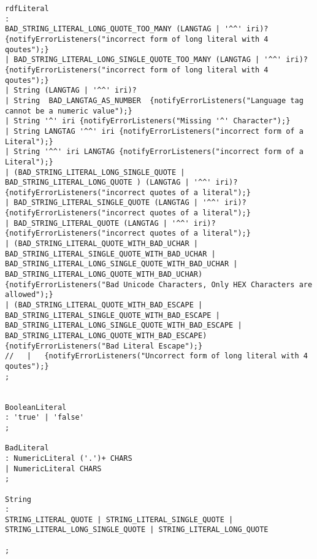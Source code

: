 \begin{lstlisting}[breaklines,basicstyle=\ttfamily]
rdfLiteral
: 
BAD_STRING_LITERAL_LONG_QUOTE_TOO_MANY (LANGTAG | '^^' iri)? {notifyErrorListeners("incorrect form of long literal with 4 qoutes");}
| BAD_STRING_LITERAL_LONG_SINGLE_QUOTE_TOO_MANY (LANGTAG | '^^' iri)? {notifyErrorListeners("incorrect form of long literal with 4 qoutes");}
| String (LANGTAG | '^^' iri)?
| String  BAD_LANGTAG_AS_NUMBER  {notifyErrorListeners("Language tag cannot be a numeric value");}
| String '^' iri {notifyErrorListeners("Missing '^' Character");}
| String LANGTAG '^^' iri {notifyErrorListeners("incorrect form of a Literal");}
| String '^^' iri LANGTAG {notifyErrorListeners("incorrect form of a Literal");}  
| (BAD_STRING_LITERAL_LONG_SINGLE_QUOTE | BAD_STRING_LITERAL_LONG_QUOTE ) (LANGTAG | '^^' iri)?  {notifyErrorListeners("incorrect quotes of a literal");}
| BAD_STRING_LITERAL_SINGLE_QUOTE (LANGTAG | '^^' iri)? {notifyErrorListeners("incorrect quotes of a literal");}
| BAD_STRING_LITERAL_QUOTE (LANGTAG | '^^' iri)? {notifyErrorListeners("incorrect quotes of a literal");}
| (BAD_STRING_LITERAL_QUOTE_WITH_BAD_UCHAR | BAD_STRING_LITERAL_SINGLE_QUOTE_WITH_BAD_UCHAR | BAD_STRING_LITERAL_LONG_SINGLE_QUOTE_WITH_BAD_UCHAR | BAD_STRING_LITERAL_LONG_QUOTE_WITH_BAD_UCHAR) {notifyErrorListeners("Bad Unicode Characters, Only HEX Characters are allowed");}
| (BAD_STRING_LITERAL_QUOTE_WITH_BAD_ESCAPE | BAD_STRING_LITERAL_SINGLE_QUOTE_WITH_BAD_ESCAPE | BAD_STRING_LITERAL_LONG_SINGLE_QUOTE_WITH_BAD_ESCAPE | BAD_STRING_LITERAL_LONG_QUOTE_WITH_BAD_ESCAPE) {notifyErrorListeners("Bad Literal Escape");}
//   |   {notifyErrorListeners("Uncorrect form of long literal with 4 qoutes");}
;


BooleanLiteral
: 'true' | 'false'
;

BadLiteral 
: NumericLiteral ('.')+ CHARS 
| NumericLiteral CHARS 
;

String
: 
STRING_LITERAL_QUOTE | STRING_LITERAL_SINGLE_QUOTE | STRING_LITERAL_LONG_SINGLE_QUOTE | STRING_LITERAL_LONG_QUOTE

;


\end{lstlisting}
